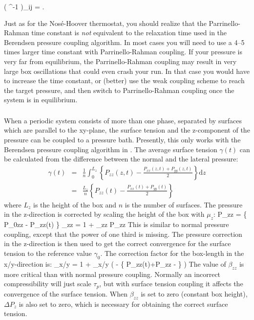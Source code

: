 \beq
\left( ^{-1} \right)_{ij} = .
\eeq

Just as for the Nos\'e-Hoover thermostat, you should realize that
the Parrinello-Rahman time constant is {\em not} equivalent to the 
relaxation time used in the Berendsen pressure coupling algorithm. 
In most cases you will need to use a 4--5
times larger time constant with Parrinello-Rahman coupling. If
your pressure is very far from equilibrium, the Parrinello-Rahman
coupling may result in very
large box oscillations that could even crash your run. 
In that case you would have to increase the time constant, or (better)
use the weak coupling scheme to reach the target pressure, and then
switch to Parrinello-Rahman coupling once the system is in equilibrium.


\subsubsection{}
When a periodic system consists of more than one phase, separated by
surfaces which are parallel to the xy-plane,
the surface tension and the z-component of the pressure can be coupled
to a pressure bath. Presently, this only works with the Berendsen
pressure coupling algorithm in {\gromacs}.
The average surface tension $\gamma(t)$ can be calculated from
the difference between the normal and the lateral pressure:
\begin{eqnarray}
\gamma(t) & = & 
\frac{1}{n} \int_0^{L_z}
\left\{ P_{zz}(z,t) - \frac{P_{xx}(z,t) + P_{yy}(z,t)}{2} \right\} \mbox{d}z \\
& = &
\frac{L_z}{n} \left\{ P_{zz}(t) - \frac{P_{xx}(t) + P_{yy}(t)}{2} \right\}
\end{eqnarray}
where $L_z$ is the height of the box and $n$ is the number of surfaces.
The pressure in the z-direction is corrected by scaling the height of
the box with $\mu_z$:
\beq
\Delta P_{zz} =  \{ P_{0zz} - P_{zz}(t) \}
\eeq
\beq
\mu_{zz} = 1 + \beta_{zz} \Delta P_{zz}
\eeq
This is similar to normal pressure coupling, except that the power
of one third is missing. 
The pressure correction in the z-direction is then used to get the
correct convergence for the surface tension to the reference value $\gamma_0$.
The correction factor for the box-length in the x/y-direction is:
\beq
\mu_{x/y} = 1 +  \beta_{x/y}
        \left( 
        - \left\{ P_{zz}(t)+\Delta P_{zz} -  \right\} 
        \right)
\eeq
The value of $\beta_{zz}$ is more critical than with normal pressure
coupling. Normally an incorrect compressibility will just scale $\tau_p$,
but with surface tension coupling it affects the convergence of the surface
tension. 
When $\beta_{zz}$ is set to zero (constant box height), $\Delta P_z$ is also set
to zero, which is necessary for obtaining the correct surface tension. 


